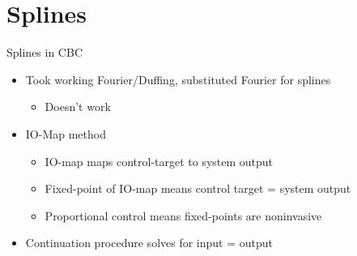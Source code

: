 \documentclass[presentation]{beamer}
\begin{document}
\section{Splines}
\label{sec:orga3bafbf}
\begin{frame}[label={sec:org1c16163}]{Splines in CBC}
\begin{itemize}
\item Took working Fourier/Duffing, substituted Fourier for splines
\begin{itemize}
\item Doesn't work
\end{itemize}
\end{itemize}
\vfill
\begin{itemize}
\item IO-Map method
\begin{itemize}
\item IO-map maps control-target to system output
\item Fixed-point of IO-map means control target = system output
\item Proportional control means fixed-points are noninvasive
\end{itemize}
\end{itemize}
\vfill
\begin{itemize}
\item Continuation procedure solves for input = output
\end{itemize}
\end{frame}
\end{document}
